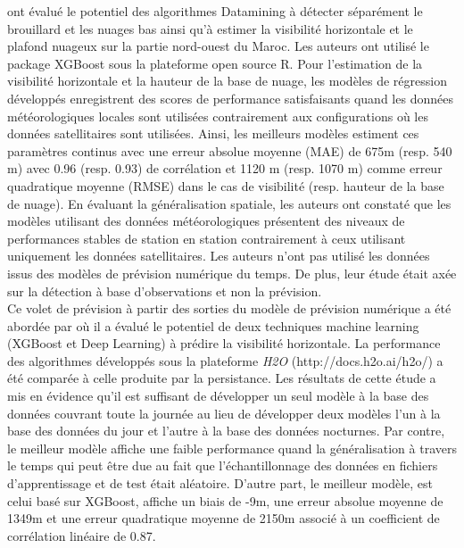 \cite{bari2017} ont évalué le potentiel des algorithmes Datamining à détecter séparément le brouillard et les nuages bas ainsi qu'à estimer la visibilité horizontale et le plafond nuageux sur la partie nord-ouest du Maroc. Les auteurs ont utilisé le package XGBoost sous la plateforme open source R. Pour l’estimation de la visibilité horizontale
et la hauteur de la base de nuage, les modèles de régression développés enregistrent des
scores de performance satisfaisants quand les données météorologiques locales sont utilisées contrairement aux configurations où les données satellitaires sont utilisées. Ainsi, les
meilleurs modèles estiment ces paramètres continus avec une erreur absolue moyenne
(MAE) de 675m (resp. 540 m) avec 0.96 (resp. 0.93) de corrélation et 1120 m (resp. 1070
m) comme erreur quadratique moyenne (RMSE) dans le cas de visibilité (resp. hauteur
de la base de nuage). En évaluant la généralisation spatiale, les auteurs ont constaté que les modèles
utilisant des données météorologiques présentent des niveaux de performances stables de
station en station contrairement à ceux utilisant uniquement les données satellitaires. Les auteurs n'ont pas utilisé les données issus des modèles de prévision numérique du temps. De plus, leur étude était axée sur la détection à base d'observations et non la prévision.\\

Ce volet de prévision à partir des sorties du modèle de prévision numérique a été abordée par \cite{bari2018visibility} où il a évalué le potentiel de deux techniques machine learning (XGBoost et Deep Learning) à prédire la visibilité horizontale. La performance des algorithmes développés sous la plateforme \textit{H2O} (http://docs.h2o.ai/h2o/) a été comparée à celle produite par la persistance. Les résultats de cette étude a mis en évidence qu'il est suffisant de développer un seul modèle à la base des données couvrant toute la journée au lieu de développer deux modèles l'un à la base des données du jour et l'autre à la base des données nocturnes. Par contre, le meilleur modèle affiche une faible performance quand la généralisation à travers le temps qui peut être due au fait que l'échantillonnage des données en fichiers d'apprentissage et de test était aléatoire. D'autre part, le meilleur modèle, est celui basé sur XGBoost, affiche un biais de -9m, une erreur absolue moyenne de 1349m et une erreur quadratique moyenne de 2150m associé à un coefficient de corrélation linéaire de 0.87.

